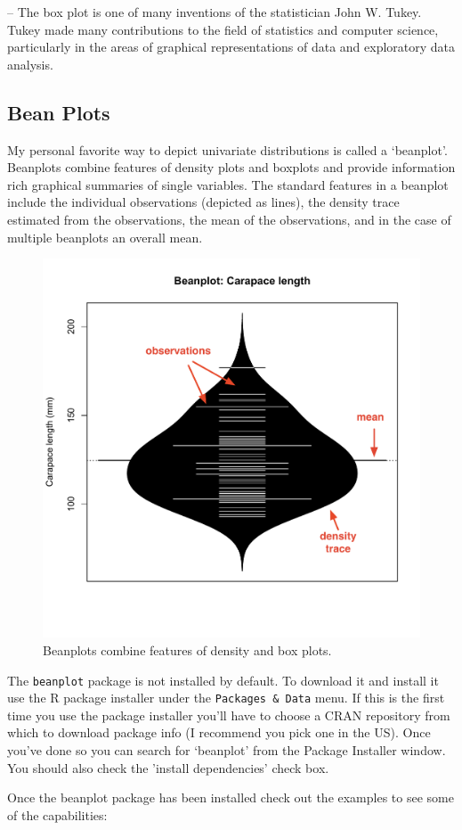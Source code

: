 -- The box plot is one of many inventions of the statistician John W.
Tukey. Tukey made many contributions to the field of statistics and
computer science, particularly in the areas of graphical representations
of data and exploratory data analysis.

\subsection{Bean Plots}

My personal favorite way to depict univariate distributions is called a
`beanplot'. Beanplots combine features of density plots and boxplots and
provide information rich graphical summaries of single variables. The
standard features in a beanplot include the individual observations
(depicted as lines), the density trace estimated from the observations,
the mean of the observations, and in the case of multiple beanplots an
overall mean.

\begin{figure}[htbp]
\centering
\includegraphics[width=0.5\columnwidth]{./figures/hands-on2/beanplot-labeled.pdf}
\caption{Beanplots combine features of density and box plots.}
\end{figure}

The \lstinline!beanplot! package is not installed by default. To
download it and install it use the R package installer under the
\lstinline!Packages & Data! menu. If this
is the first time you use the package installer you'll have to choose a
CRAN repository from which to download package info (I recommend you
pick one in the US). Once you've done so you can search for `beanplot'
from the Package Installer window. You should also check the 'install
dependencies' check box.

Once the beanplot package has been installed check out the examples to
see some of the capabilities:

